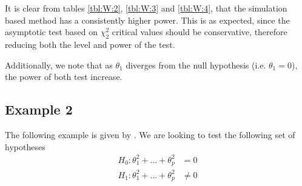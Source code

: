 \documentclass[]{article}\usepackage[]{graphicx}\usepackage[]{color}
\begin{document}
\begin{table}[H]
	\centering
	\caption{Empirical levels for 1000 replications of the Wald statistic where $\alpha = 5\%$ and $\theta_1=1$, testing $H_0: \left[ \theta_1\theta_2, \theta_1\right] =0$ against $H_1: \left[ \theta_1\theta_2, \theta_1\right] \neq 0$}
	\label{tbl:W:4}
\end{table}


It is clear from tables \ref{tbl:W:2}, \ref{tbl:W:3} and \ref{tbl:W:4}, that the simulation based method has a consistently higher power. This is as expected, since the asymptotic test based on $\chi_2^2$ critical values should be conservative, therefore reducing both the level and power of the test.

Additionally, we note that as $\theta_1$ diverges from the null hypothesis (i.e. $\theta_1=0$), the power of both test increase.

\subsection{Example 2}
The following example is given by \cite{dufour_wald_2013}. We are looking to test the following set of hypotheses
\begin{align}
	H_0: \theta_1^2+...+\theta_p^2 & = 0 \\
	H_1: \theta_1^2+...+\theta_p^2  & \neq 0
\end{align}
\end{document}
